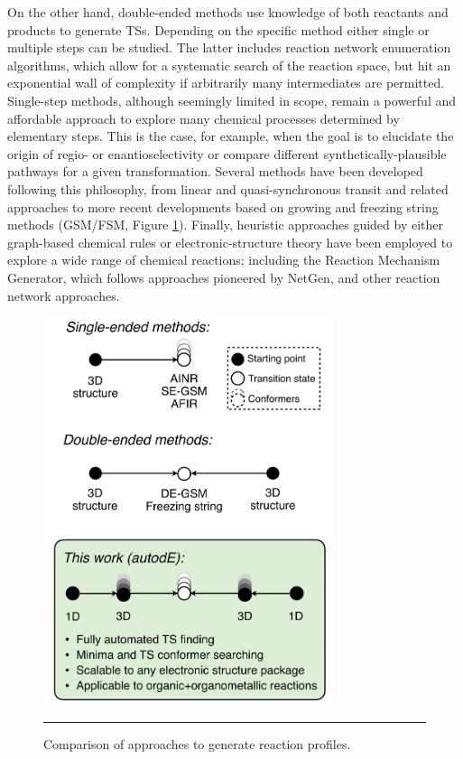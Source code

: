 \documentclass[../../main.tex]{subfiles}
\begin{document}
On the other hand, double-ended methods use knowledge of both reactants and products to generate TSs. Depending on the specific method either single or multiple steps can be studied. The latter includes reaction network enumeration algorithms, which allow for a systematic search of the reaction space, but hit an exponential wall of complexity if arbitrarily many intermediates are permitted.\cite{Kim2018, Habershon2016} Single-step methods, although seemingly limited in scope, remain a powerful and affordable approach to explore many chemical processes determined by elementary steps. This is the case, for example, when the goal is to elucidate the origin of regio- or enantioselectivity or compare different synthetically-plausible pathways for a given transformation. Several methods have been developed following this philosophy, from linear and quasi-synchronous transit\cite{Halgren1977, Peng1993} and related approaches\cite{Dewar1984, Elber1987} to more recent developments based on growing\cite{Dohm2020} and freezing string methods\cite{Suleimanov2015, Behn2011} (GSM/FSM, Figure \ref{fig::ade_1}). Finally, heuristic approaches guided by either graph-based chemical rules or electronic-structure theory have been employed to explore a wide range of chemical reactions; including the Reaction Mechanism Generator,\cite{Gao2016} which follows approaches pioneered by NetGen,\cite{Broadbelt1994} and other reaction network approaches.\cite{Rappoport2019, Bergeler2015}


\begin{figure}[h!]
	\vspace{0.4cm}
	\centering
	\includegraphics[width=8.5cm]{5/autode/figs/fig1}
	\vspace{0.4cm}
	\hrule
	\caption{Comparison of approaches to generate reaction profiles.}
	\label{fig::ade_1}
\end{figure}
\end{document}
